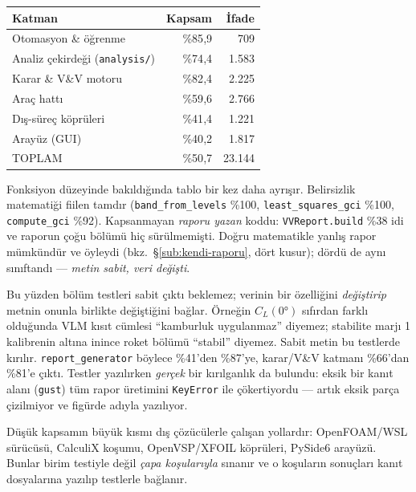 \documentclass[11pt,a4paper]{article}
\begin{document}
\begin{center}\footnotesize
\begin{tabular}{@{}lrr@{}}
\toprule
\textbf{Katman} & \textbf{Kapsam} & \textbf{İfade} \\
\midrule
\rowcolor{iyibg} Otomasyon \& öğrenme & \%85{,}9 & 709 \\
\rowcolor{iyibg} Analiz çekirdeği (\texttt{analysis/}) & \%74{,}4 & 1.583 \\
\rowcolor{iyibg} Karar \& V\&V motoru & \%82{,}4 & 2.225 \\
\rowcolor{ortabg} Araç hattı & \%59{,}6 & 2.766 \\
\rowcolor{ortabg} Dış-süreç köprüleri & \%41{,}4 & 1.221 \\
\rowcolor{ortabg} Arayüz (GUI) & \%40{,}2 & 1.817 \\
\midrule
TOPLAM & \%50{,}7 & 23.144 \\
\bottomrule
\end{tabular}
\end{center}

\noindent Fonksiyon düzeyinde bakıldığında tablo bir kez daha ayrışır.
Belirsizlik matematiği fiilen tamdır (\texttt{band\_from\_levels} \%100,
\texttt{least\_squares\_gci} \%100, \texttt{compute\_gci} \%92). Kapsanmayan
\emph{raporu yazan} koddu: \texttt{VVReport.build} \%38 idi ve raporun çoğu
bölümü hiç sürülmemişti. Doğru matematikle yanlış rapor mümkündür ve öyleydi
(bkz.\ \S\ref{sub:kendi-raporu}, dört kusur); dördü de aynı sınıftandı --- \emph{metin sabit, veri
değişti}.

Bu yüzden bölüm testleri sabit çıktı beklemez; verinin bir özelliğini
\emph{değiştirip} metnin onunla birlikte değiştiğini bağlar. Örneğin $C_L(0°)$
sıfırdan farklı olduğunda VLM kısıt cümlesi ``kamburluk uygulanmaz'' diyemez;
stabilite marjı 1 kalibrenin altına inince roket bölümü ``stabil'' diyemez.
Sabit metin bu testlerde kırılır. \texttt{report\_generator} böylece \%41'den
\%87'ye, karar/V\&V katmanı \%66'dan \%81'e çıktı. Testler yazılırken
\emph{gerçek} bir kırılganlık da bulundu: eksik bir kanıt alanı
(\texttt{gust}) tüm rapor üretimini \texttt{KeyError} ile çökertiyordu --- artık
eksik parça çizilmiyor ve figürde adıyla yazılıyor.

Düşük kapsamın büyük kısmı dış çözücülerle çalışan yollardır: OpenFOAM/WSL
sürücüsü, CalculiX koşumu, OpenVSP/XFOIL köprüleri, PySide6 arayüzü. Bunlar birim
testiyle değil \emph{çapa koşularıyla} sınanır ve o koşuların sonuçları kanıt
dosyalarına yazılıp testlerle bağlanır.
\end{document}

